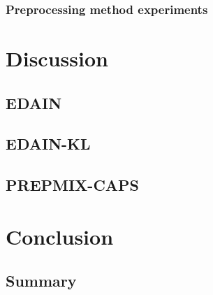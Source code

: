 \documentclass{statsmsc}
\begin{document}
{%

\subsection{Preprocessing method experiments}%
\label{sub:Preprocessing method experiments}




\chapter{Discussion} %


\section{EDAIN}%
\label{sec:EDAIN-discuss}


\section{EDAIN-KL}%
\label{sec:EDAIN-KL-discuss}



\section{PREPMIX-CAPS}%
\label{sec:PREPMIX-CAPS}



\chapter{Conclusion} %

\section{Summary}%
\label{sec:Summary}



}
\end{document}
